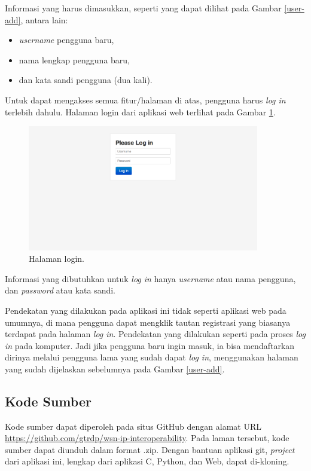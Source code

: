 			Informasi yang harus dimasukkan, seperti yang dapat dilihat pada Gambar \ref{user-add}, antara lain:

				\begin{itemize}
					\item \emph{username} pengguna baru,
					\item nama lengkap pengguna baru,
					\item dan kata sandi pengguna (dua kali).
				\end{itemize}

			Untuk dapat mengakses semua fitur/halaman di atas, pengguna harus \emph{log in} terlebih dahulu. Halaman login dari aplikasi web terlihat pada Gambar \ref{login}.

				\begin{figure}[H]
				  \centering
				    \includegraphics[width=0.9\textwidth]{gambar/login}
				    \caption{Halaman login.}
				    \label{login}
				\end{figure}

			Informasi yang dibutuhkan untuk \emph{log in} hanya \emph{username} atau nama pengguna, dan \emph{password} atau kata sandi.

			Pendekatan yang dilakukan pada aplikasi ini tidak seperti aplikasi web pada umumnya, di mana pengguna dapat mengklik tautan registrasi yang biasanya terdapat pada halaman \emph{log in}. Pendekatan yang dilakukan seperti pada proses \emph{log in} pada komputer. Jadi jika pengguna baru ingin masuk, ia bisa mendaftarkan dirinya melalui pengguna lama yang sudah dapat \emph{log in}, menggunakan halaman yang sudah dijelaskan sebelumnya pada Gambar \ref{user-add}.


		\subsection{Kode Sumber}
			Kode sumber dapat diperoleh pada situs GitHub dengan alamat URL \url{https://github.com/gtrdp/wsn-ip-interoperability}. Pada laman tersebut, kode sumber dapat diunduh dalam format .zip. Dengan bantuan aplikasi git, \emph{project} dari aplikasi ini, lengkap dari aplikasi C, Python, dan Web, dapat di-kloning.


